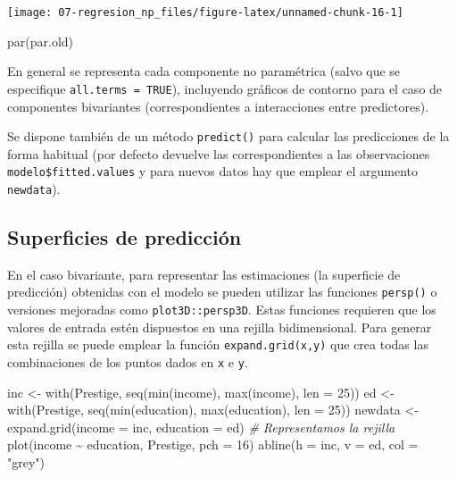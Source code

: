 \documentclass[
]{book}
\newenvironment{Shaded}{\begin{snugshade}}{\end{snugshade}}
\newcommand{\AttributeTok}[1]{\textcolor[rgb]{0.77,0.63,0.00}{#1}}
\newcommand{\CommentTok}[1]{\textcolor[rgb]{0.56,0.35,0.01}{\textit{#1}}}
\newcommand{\DecValTok}[1]{\textcolor[rgb]{0.00,0.00,0.81}{#1}}
\newcommand{\FunctionTok}[1]{\textcolor[rgb]{0.00,0.00,0.00}{#1}}
\newcommand{\NormalTok}[1]{#1}
\newcommand{\OtherTok}[1]{\textcolor[rgb]{0.56,0.35,0.01}{#1}}
\newcommand{\SpecialCharTok}[1]{\textcolor[rgb]{0.00,0.00,0.00}{#1}}
\newcommand{\StringTok}[1]{\textcolor[rgb]{0.31,0.60,0.02}{#1}}
\theoremstyle{break}
\theoremstyle{definition}
\theoremstyle{definition}
\theoremstyle{definition}
\theoremstyle{definition}
\theoremstyle{remark}
\begin{document}
\begin{center}\texttt{[image: 07-regresion\_np\_files/figure-latex/unnamed-chunk-16-1]} \end{center}

\begin{Shaded}
\begin{Highlighting}[]
\FunctionTok{par}\NormalTok{(par.old)}
\end{Highlighting}
\end{Shaded}

En general se representa cada componente no paramétrica (salvo que se especifique \texttt{all.terms\ =\ TRUE}), incluyendo gráficos de contorno para el caso de componentes bivariantes (correspondientes a interacciones entre predictores).

Se dispone también de un método \texttt{predict()} para calcular las predicciones de la forma habitual (por defecto devuelve las correspondientes a las observaciones \texttt{modelo\$fitted.values} y para nuevos datos hay que emplear el argumento \texttt{newdata}).

\hypertarget{superficies-de-predicciuxf3n}{%
\subsection{Superficies de predicción}\label{superficies-de-predicciuxf3n}}

En el caso bivariante, para representar las estimaciones (la superficie de predicción) obtenidas con el modelo se pueden utilizar las funciones \texttt{persp()} o versiones mejoradas como \texttt{plot3D::persp3D}.
Estas funciones requieren que los valores de entrada estén dispuestos en una rejilla bidimensional.
Para generar esta rejilla se puede emplear la función \texttt{expand.grid(x,y)} que crea todas las combinaciones de los puntos dados en \texttt{x} e \texttt{y}.

\begin{Shaded}
\begin{Highlighting}[]
\NormalTok{inc }\OtherTok{\textless{}{-}} \FunctionTok{with}\NormalTok{(Prestige, }\FunctionTok{seq}\NormalTok{(}\FunctionTok{min}\NormalTok{(income), }\FunctionTok{max}\NormalTok{(income), }\AttributeTok{len =} \DecValTok{25}\NormalTok{))}
\NormalTok{ed }\OtherTok{\textless{}{-}} \FunctionTok{with}\NormalTok{(Prestige, }\FunctionTok{seq}\NormalTok{(}\FunctionTok{min}\NormalTok{(education), }\FunctionTok{max}\NormalTok{(education), }\AttributeTok{len =} \DecValTok{25}\NormalTok{))}
\NormalTok{newdata }\OtherTok{\textless{}{-}} \FunctionTok{expand.grid}\NormalTok{(}\AttributeTok{income =}\NormalTok{ inc, }\AttributeTok{education =}\NormalTok{ ed)}
\CommentTok{\# Representamos la rejilla}
\FunctionTok{plot}\NormalTok{(income }\SpecialCharTok{\textasciitilde{}}\NormalTok{ education, Prestige, }\AttributeTok{pch =} \DecValTok{16}\NormalTok{)}
\FunctionTok{abline}\NormalTok{(}\AttributeTok{h =}\NormalTok{ inc, }\AttributeTok{v =}\NormalTok{ ed, }\AttributeTok{col =} \StringTok{"grey"}\NormalTok{)}
\end{Highlighting}
\end{Shaded}
\end{document}
